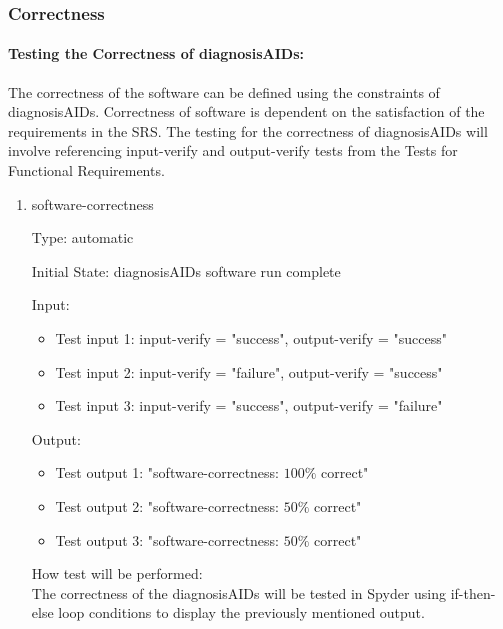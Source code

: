 \documentclass[12pt, titlepage]{article}
\begin{document}
\begin{enumerate}
\subsubsection{Correctness}
		
\paragraph{Testing the Correctness of diagnosisAIDs:}
The correctness of the software can be defined using the constraints of 
diagnosisAIDs. Correctness of software is dependent on the satisfaction of the 
requirements in the SRS. The testing for the correctness of diagnosisAIDs will 
involve referencing input-verify and output-verify tests from the Tests for 
Functional Requirements.

\begin{enumerate}

\item{software-correctness\\}

Type: automatic
					
Initial State: diagnosisAIDs software run complete
					
Input:
\begin{itemize} %
\item Test input 1: input-verify = "success", output-verify = "success"
\item Test input 2: input-verify = "failure", output-verify = "success"
\item Test input 3: input-verify = "success", output-verify = "failure"
\end{itemize}

Output: 
\begin{itemize}
\item Test output 1: "software-correctness: $100\%$ correct"
\item Test output 2: "software-correctness: $50\%$ correct" 
\item Test output 3: "software-correctness: $50\%$ correct"
\end{itemize}
					
How test will be performed: \\
The correctness of the diagnosisAIDs will be tested in Spyder using if-then-else 
loop conditions to display the previously mentioned output. \\

\end{enumerate}


\end{enumerate}
\end{document}
